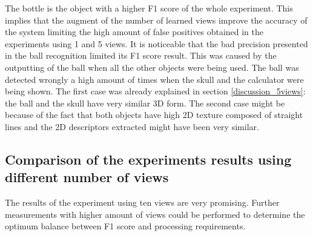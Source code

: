 	The bottle is the object with a higher F1 score of the whole experiment. 
	This implies that the augment of the number of learned views improve the accuracy of the system limiting the high amount of false positives obtained in the experiments using 1 and 5 views. 
	It is noticeable that the bad precision presented in the ball recognition limited its F1 score result. 
	This was caused by the outputting of the ball when all the other objects were being used. 
	The ball was detected wrongly a high amount of times when the skull and the calculator were being shown.
	The first case was already explained in section \ref{discussion_5views}: the ball and the skull have very similar 3D form. 
	The second case might be because of the fact that both objects have high 2D texture composed of straight lines and the 2D descriptors extracted might have been very similar. 


	\subsection{Comparison of the experiments results using different number of views}

	The results of the experiment using ten views are very promising. 
	Further measurements with higher amount of views could be performed to determine the optimum balance between F1 score and processing requirements. 
	